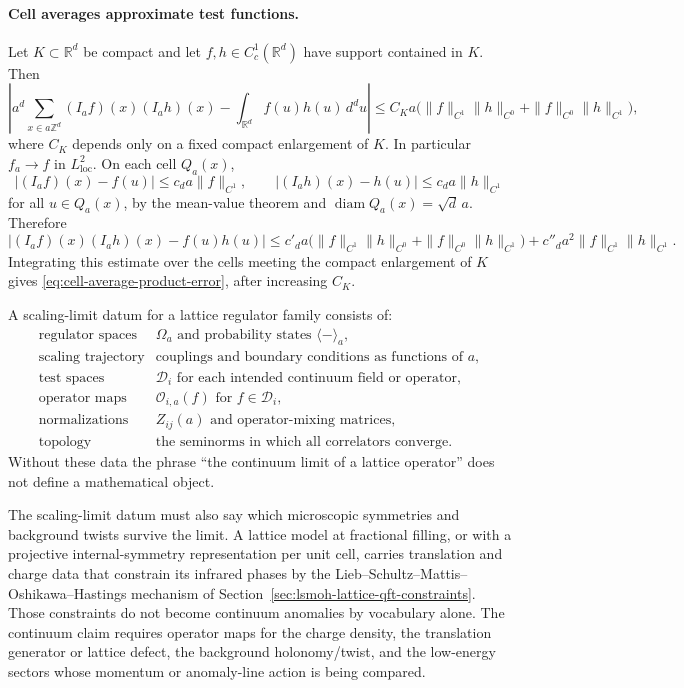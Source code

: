 \paragraph{Cell averages approximate test functions.}
Let \(K\subset\mathbb R^d\) be compact and let \(f,h\in C_c^1(\mathbb R^d)\)
have support contained in \(K\).  Then
\begin{equation}
  \left|
  a^d\sum_{x\in a\mathbb Z^d}(I_af)(x)(I_ah)(x)
  -
  \int_{\mathbb R^d} f(u)h(u)\,d^du
  \right|
  \leq
  C_K a
  \bigl(\|f\|_{C^1}\|h\|_{C^0}+\|f\|_{C^0}\|h\|_{C^1}\bigr),
  \label{eq:cell-average-product-error}
\end{equation}
where \(C_K\) depends only on a fixed compact enlargement of \(K\).  In
particular \(f_a\to f\) in \(L^2_{\mathrm{loc}}\).
On each cell \(Q_a(x)\),
\[
  |(I_af)(x)-f(u)|\leq c_d a\|f\|_{C^1},
  \qquad
  |(I_ah)(x)-h(u)|\leq c_d a\|h\|_{C^1}
  \]
for all \(u\in Q_a(x)\), by the mean-value theorem and
\(\operatorname{diam}Q_a(x)=\sqrt d\,a\).  Therefore
\[
  |(I_af)(x)(I_ah)(x)-f(u)h(u)|
  \leq
  c'_d a
  \bigl(\|f\|_{C^1}\|h\|_{C^0}+\|f\|_{C^0}\|h\|_{C^1}\bigr)
  +
  c''_d a^2\|f\|_{C^1}\|h\|_{C^1}.
\]
Integrating this estimate over the cells meeting the compact enlargement of
\(K\) gives \eqref{eq:cell-average-product-error}, after increasing \(C_K\).

\begin{definition}
\label{def:scaling-limit-datum}
A scaling-limit datum for a lattice regulator family consists of:
\[
\begin{array}{ll}
\text{regulator spaces} & \Omega_a\text{ and probability states }\langle-\rangle_a,\\
\text{scaling trajectory} & \text{couplings and boundary conditions as
functions of }a,\\
\text{test spaces} & \mathcal D_i\text{ for each intended continuum field
or operator},\\
\text{operator maps} & \mathcal O_{i,a}(f)\text{ for }f\in\mathcal D_i,\\
\text{normalizations} & Z_{ij}(a)\text{ and operator-mixing matrices},\\
\text{topology} & \text{the seminorms in which all correlators converge}.
\end{array}
\]
Without these data the phrase ``the continuum limit of a lattice operator''
does not define a mathematical object.
\end{definition}

The scaling-limit datum must also say which microscopic symmetries and
background twists survive the limit.  A lattice model at fractional filling, or
with a projective internal-symmetry representation per unit cell, carries
translation and charge data that constrain its infrared phases by the
Lieb--Schultz--Mattis--Oshikawa--Hastings mechanism of
Section~\ref{sec:lsmoh-lattice-qft-constraints}.  Those constraints do not
become continuum anomalies by vocabulary alone.  The continuum claim requires
operator maps for the charge density, the translation generator or lattice
defect, the background holonomy/twist, and the low-energy sectors whose
momentum or anomaly-line action is being compared.

